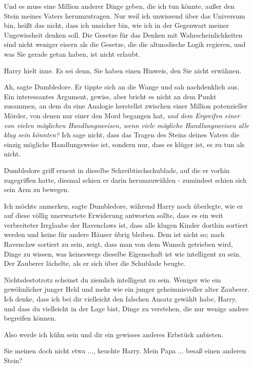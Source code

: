 Und es muss eine Million anderer Dinge geben, die ich tun könnte, außer den
Stein meines Vaters herumzutragen. Nur weil ich unwissend über das Universum
bin, heißt das nicht, dass ich unsicher bin, wie ich in der Gegenwart meiner
Ungewissheit denken soll. Die Gesetze für das Denken mit Wahrscheinlichkeiten
sind nicht weniger eisern als die Gesetze, die die altmodische Logik regieren,
und was Sie gerade getan haben, ist nicht erlaubt.\grqq{}

Harry hielt inne. \glqq{}Es sei denn, Sie haben einen Hinweis, den Sie nicht
erwähnen.\grqq{}

\glqq{}Ah\grqq{}, sagte Dumbledore. Er tippte sich an die Wange und sah
nachdenklich aus. \glqq{}Ein interessantes Argument, gewiss, aber bricht es nicht
an dem Punkt zusammen, an dem du eine Analogie herstellst zwischen einer Million
potenzieller Mörder, von denen nur einer den Mord begangen hat, \emph{und dem
Ergreifen einer von vielen möglichen Handlungsweisen, wenn viele mögliche
Handlungsweisen alle klug sein könnten?} Ich sage nicht, dass das Tragen des
Steins deines Vaters die einzig mögliche Handlungsweise ist, sondern nur, dass
es klüger ist, es zu tun als nicht.\grqq{}

Dumbledore griff erneut in dieselbe Schreibtischschublade, auf die er vorhin
zugegriffen hatte, diesmal schien er darin herumzuwühlen - zumindest schien sich
sein Arm zu bewegen.

\glqq{}Ich möchte anmerken\grqq{}, sagte Dumbledore, während Harry noch
überlegte, wie er auf diese völlig unerwartete Erwiderung antworten sollte,
\glqq{}dass es ein weit verbreiteter Irrglaube der Ravenclaws ist, dass alle
klugen Kinder dorthin sortiert werden und keine für andere Häuser übrig bleiben.
Dem ist nicht so; nach Ravenclaw sortiert zu sein, zeigt, dass man von dem
Wunsch getrieben wird, Dinge zu wissen, was keineswegs dieselbe Eigenschaft ist
wie intelligent zu sein.\grqq{} Der Zauberer lächelte, als er sich über die
Schublade beugte.

\glqq{}Nichtsdestotrotz scheinst du ziemlich intelligent zu sein. Weniger wie ein
gewöhnlicher junger Held und mehr wie ein junger geheimnisvoller alter Zauberer.
Ich denke, dass ich bei dir vielleicht den falschen Ansatz gewählt habe, Harry,
und dass du vielleicht in der Lage bist, Dinge zu verstehen, die nur wenige
andere begreifen können.

Also werde ich kühn sein und dir ein gewisses anderes Erbstück anbieten.\grqq{}

\glqq{}Sie meinen doch nicht etwa ...\grqq{}, keuchte Harry. \glqq{}Mein Papa ...
besaß einen anderen Stein?\grqq{}

